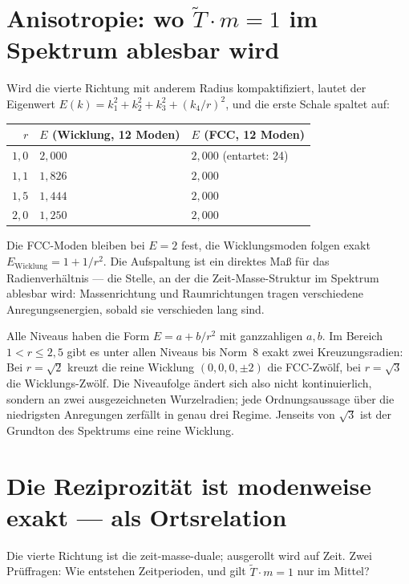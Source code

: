 \section{Anisotropie: wo $\tilde T\cdot m = 1$ im Spektrum ablesbar wird}

Wird die vierte Richtung mit anderem Radius kompaktifiziert, lautet der
Eigenwert $E(k) = k_1^2+k_2^2+k_3^2+(k_4/r)^2$, und die erste Schale
spaltet auf:

\begin{center}
\small
\begin{tabular}{rll}
\toprule
$r$ & $E$ (Wicklung, 12 Moden) & $E$ (FCC, 12 Moden) \\
\midrule
$1{,}0$ & $2{,}000$ & $2{,}000$ (entartet: 24) \\
$1{,}1$ & $1{,}826$ & $2{,}000$ \\
$1{,}5$ & $1{,}444$ & $2{,}000$ \\
$2{,}0$ & $1{,}250$ & $2{,}000$ \\
\bottomrule
\end{tabular}
\end{center}

Die FCC-Moden bleiben bei $E = 2$ fest, die Wicklungsmoden folgen exakt
$E_{\mathrm{Wicklung}} = 1+1/r^2$. Die Aufspaltung ist ein direktes Maß
für das Radienverhältnis --- die Stelle, an der die Zeit-Masse-Struktur
im Spektrum ablesbar wird: Massenrichtung und Raumrichtungen tragen
verschiedene Anregungsenergien, sobald sie verschieden lang sind.

Alle Niveaus haben die Form $E = a+b/r^2$ mit ganzzahligen $a,b$. Im
Bereich $1<r\le2{,}5$ gibt es unter allen Niveaus bis Norm~8 exakt zwei
Kreuzungsradien: Bei $r = \sqrt2$ kreuzt die reine Wicklung
$(0,0,0,\pm2)$ die FCC-Zwölf, bei $r = \sqrt3$ die Wicklungs-Zwölf. Die
Niveaufolge ändert sich also nicht kontinuierlich, sondern an zwei
ausgezeichneten Wurzelradien; jede Ordnungsaussage über die niedrigsten
Anregungen zerfällt in genau drei Regime. Jenseits von $\sqrt3$ ist der
Grundton des Spektrums eine reine Wicklung.

\section{Die Reziprozität ist modenweise exakt --- als Ortsrelation}

Die vierte Richtung ist die zeit-masse-duale; ausgerollt wird auf Zeit.
Zwei Prüffragen: Wie entstehen Zeitperioden, und gilt $\tilde T\cdot m = 1$
nur im Mittel?

